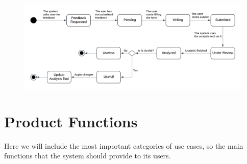 \begin{enumerate}
\begin{figure}[H]
    \centering
    \includegraphics[width=1\linewidth]{RASD//Images/feedback2.png}
    \caption{}
    \label{fig:enter-label}
\end{figure}

\end{enumerate}

\pagebreak
\section{Product Functions}

Here we will include the most important categories of use cases, so the main functions that the system should provide to its users.

